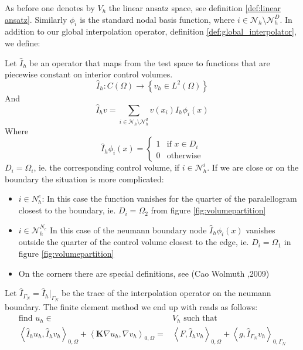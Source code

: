 \documentclass[../Main/main.tex]{subfiles}
\begin{document}
	\par 
	As before one denotes by $V_h$ the linear ansatz space, see definition \ref{def:linear ansatz}. Similarly $\phi_i$ is the standard nodal basis function, where $i \in \mathcal{N}_h \setminus \mathcal{N}_h^D$.
	In addition to our global interpolation operator, definition \ref{def:global_interpolator}, we define:
	\begin{definition} \label{def:piecewise_interpolator}
		Let $\hat{I}_h$ be an operator that maps from the test space to functions that are piecewise constant on interior control volumes.
		\begin{equation*}
			\hat{I}_h:C(\Omega)\rightarrow \left \{ v_h \in L^2(\Omega) \right \}
		\end{equation*}
		And
		\begin{equation*}
			\hat{I}_h v = \sum_{i\in \mathcal{N}_h\setminus\mathcal{N}_h^d}v(x_i)\hat{I}_h\phi_i(x)
		\end{equation*}
		Where
		\begin{equation}
			\hat{I}_h\phi_i(x)=\left\{\begin{matrix}
				1 & \text{if } x\in D_i\\ 
				0 & \text{otherwise}
			\end{matrix}\right.
		\end{equation}
		$D_i = \Omega_i$, ie. the corresponding control volume, if $i \in \mathcal{N}_h^i$. If we are close or on the boundary the situation is more complicated: 
		\begin{itemize}
			\item $i \in N_h^e$: In this case the function vanishes for the quarter of the paralellogram closest to the boundary, ie. $D_i = \Omega_2$ from figure \ref{fig:volumepartition}
			\item $i \in \mathcal{N}_h^{N_e}$ In this case of the neumann boundary node $	\hat{I}_h\phi_i(x)$ vanishes outside the quarter of the control volume closest to the edge, ie. $D_i = \Omega_1$ in figure \ref{fig:volumepartition}
			\item On the corners there are special definitions, see (Cao Wolmuth \cite{https://doi.org/10.1002/num.20525},2009)
		\end{itemize} 
	\end{definition}
	Let $\hat{I}_{\Gamma_N} = \hat{I}_{h}|_{\Gamma_N}$ be the trace of the interpolation operator on the neumann boundary.
	The finite element method we end up with reads as follows:
	\begin{equation} \label{eq:modified_fem}
		\begin{aligned}
			\text{find }u_h\in&V_h \text{ such that}\\
			\left \langle \hat{I}_h u_h,\hat{I}_h v_h \right \rangle_{0,\Omega} +   \left \langle \pmb{K} \nabla u_h,\nabla v_h \right \rangle_{0,\Omega} =& \left \langle F,\hat{I}_h v_h \right \rangle_{0,\Omega} + \left \langle g,\hat{I}_{\Gamma_N} v_h \right \rangle_{0,\Gamma_N} 
		\end{aligned}
	\end{equation}
\end{document}
